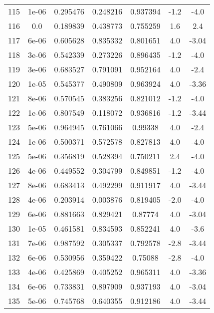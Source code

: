 \begin{table}
\begin{tabular}{c|c|c|c|c|c|c}
115 & 1e-06 & 0.295476 & 0.248216 & 0.937394 & -1.2 & -4.0\\
116 & 0.0 & 0.189839 & 0.438773 & 0.755259 & 1.6 & 2.4\\
117 & 6e-06 & 0.605628 & 0.835332 & 0.801651 & 4.0 & -3.04\\
118 & 3e-06 & 0.542339 & 0.273226 & 0.896435 & -1.2 & -4.0\\
119 & 3e-06 & 0.683527 & 0.791091 & 0.952164 & 4.0 & -2.4\\
120 & 1e-05 & 0.545377 & 0.490809 & 0.963924 & 4.0 & -3.36\\
121 & 8e-06 & 0.570545 & 0.383256 & 0.821012 & -1.2 & -4.0\\
122 & 1e-06 & 0.807549 & 0.118072 & 0.936816 & -1.2 & -3.44\\
123 & 5e-06 & 0.964945 & 0.761066 & 0.99338 & 4.0 & -2.4\\
124 & 1e-06 & 0.500371 & 0.572578 & 0.827813 & 4.0 & -4.0\\
125 & 5e-06 & 0.356819 & 0.528394 & 0.750211 & 2.4 & -4.0\\
126 & 4e-06 & 0.449552 & 0.304799 & 0.849851 & -1.2 & -4.0\\
127 & 8e-06 & 0.683413 & 0.492299 & 0.911917 & 4.0 & -3.44\\
128 & 4e-06 & 0.203914 & 0.003876 & 0.819405 & -2.0 & -4.0\\
129 & 6e-06 & 0.881663 & 0.829421 & 0.87774 & 4.0 & -3.04\\
130 & 1e-05 & 0.461581 & 0.834593 & 0.852241 & 4.0 & -3.6\\
131 & 7e-06 & 0.987592 & 0.305337 & 0.792578 & -2.8 & -3.44\\
132 & 6e-06 & 0.530956 & 0.359422 & 0.75088 & -2.8 & -4.0\\
133 & 4e-06 & 0.425869 & 0.405252 & 0.965311 & 4.0 & -3.36\\
134 & 6e-06 & 0.733831 & 0.897909 & 0.937193 & 4.0 & -3.04\\
135 & 5e-06 & 0.745768 & 0.640355 & 0.912186 & 4.0 & -3.44\\
\end{tabular}
\end{table}
\newpage
